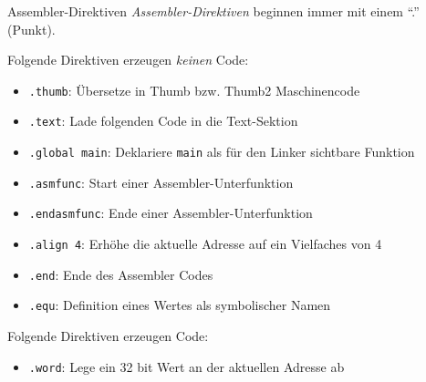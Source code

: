 \begin{bonus}{Assembler-Direktiven}
    \emph{Assembler-Direktiven} beginnen immer mit einem \enquote{.} (Punkt).

    Folgende Direktiven erzeugen \emph{keinen} Code:
    \begin{itemize}
        \item \texttt{.thumb}: Übersetze in Thumb bzw. Thumb2 Maschinencode
        \item \texttt{.text}: Lade folgenden Code in die Text-Sektion
        \item \texttt{.global main}: Deklariere \texttt{main} als für den Linker sichtbare Funktion
        \item \texttt{.asmfunc}: Start einer Assembler-Unterfunktion
        \item \texttt{.endasmfunc}: Ende einer Assembler-Unterfunktion
        \item \texttt{.align 4}: Erhöhe die aktuelle Adresse auf ein Vielfaches von 4
        \item \texttt{.end}: Ende des Assembler Codes
        \item \texttt{.equ}: Definition eines Wertes als symbolischer Namen
    \end{itemize}

    Folgende Direktiven erzeugen Code:
    \begin{itemize}
        \item \texttt{.word}: Lege ein 32 bit Wert an der aktuellen Adresse ab
    \end{itemize}
\end{bonus}

